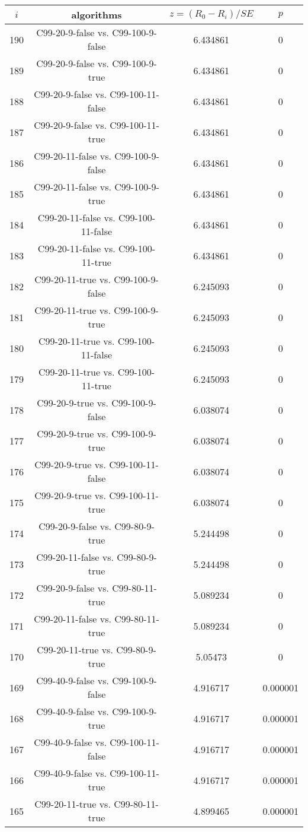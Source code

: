 \documentclass[a4paper,10pt]{article}
\begin{document}
\begin{landscape}
\begin{table}[!htp]
\centering\scriptsize
\begin{tabular}{cccc}
$i$&algorithms&$z=(R_0 - R_i)/SE$&$p$\\
\hline190&C99-20-9-false vs. C99-100-9-false&6.434861&0\\
189&C99-20-9-false vs. C99-100-9-true&6.434861&0\\
188&C99-20-9-false vs. C99-100-11-false&6.434861&0\\
187&C99-20-9-false vs. C99-100-11-true&6.434861&0\\
186&C99-20-11-false vs. C99-100-9-false&6.434861&0\\
185&C99-20-11-false vs. C99-100-9-true&6.434861&0\\
184&C99-20-11-false vs. C99-100-11-false&6.434861&0\\
183&C99-20-11-false vs. C99-100-11-true&6.434861&0\\
182&C99-20-11-true vs. C99-100-9-false&6.245093&0\\
181&C99-20-11-true vs. C99-100-9-true&6.245093&0\\
180&C99-20-11-true vs. C99-100-11-false&6.245093&0\\
179&C99-20-11-true vs. C99-100-11-true&6.245093&0\\
178&C99-20-9-true vs. C99-100-9-false&6.038074&0\\
177&C99-20-9-true vs. C99-100-9-true&6.038074&0\\
176&C99-20-9-true vs. C99-100-11-false&6.038074&0\\
175&C99-20-9-true vs. C99-100-11-true&6.038074&0\\
174&C99-20-9-false vs. C99-80-9-true&5.244498&0\\
173&C99-20-11-false vs. C99-80-9-true&5.244498&0\\
172&C99-20-9-false vs. C99-80-11-true&5.089234&0\\
171&C99-20-11-false vs. C99-80-11-true&5.089234&0\\
170&C99-20-11-true vs. C99-80-9-true&5.05473&0\\
169&C99-40-9-false vs. C99-100-9-false&4.916717&0.000001\\
168&C99-40-9-false vs. C99-100-9-true&4.916717&0.000001\\
167&C99-40-9-false vs. C99-100-11-false&4.916717&0.000001\\
166&C99-40-9-false vs. C99-100-11-true&4.916717&0.000001\\
165&C99-20-11-true vs. C99-80-11-true&4.899465&0.000001\\

\end{tabular}
\end{table}
\end{landscape}
\end{document}
